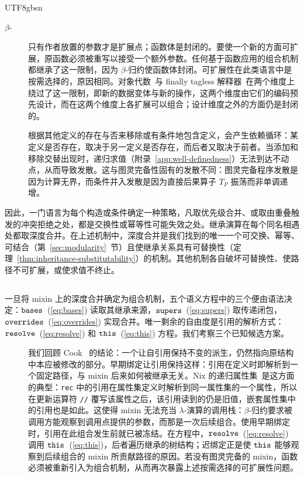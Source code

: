 \begin{CJK*}{UTF8}{gbsn}
\begin{description}
  \item[$\beta$-]
    只有作者放置的参数才是扩展点；函数体是封闭的。要使一个新的方面可扩展，原函数必须被重写以接受一个额外参数。任何基于函数应用的组合机制都继承了这一限制，因为 $\beta$-归约使函数体封闭。可扩展性在此类语言中是按需选择的，原因相同。对象代数~\cite{oliveira2012-object-algebras}与 finally tagless 解释器~\cite{carette2009-finally-tagless}在两个维度上绕过了这一限制，即新的数据变体与新的操作，这两个维度由它们的编码预先设计，而在这两个维度上各扩展可以组合；设计维度之外的方面仍是封闭的。

  \item[]
    根据其他定义的存在与否来移除或有条件地包含定义，会产生依赖循环：某定义是否存在，取决于另一定义是否存在，而后者又取决于前者。当添加和移除交替出现时，递归求值（附录~\ref{app:well-definedness}）无法到达不动点，从而导致发散。这与图灵完备性固有的发散不同：图灵完备程序发散是因为计算无界，而条件并入发散是因为直接后果算子 $T_P$ 振荡而非单调递增。
\end{description}

\noindent
因此，一门语言为每个构造或条件确定一种策略，凡取优先级合并、或取由重叠触发的冲突拒绝之处，都是交换性或幂等性可能失效之处。继承演算在每个同名相遇处都取深度合并。在上述机制中，深度合并是我们找到的唯一一个可交换、幂等、可结合（第~\ref{sec:modularity}~节）且使继承关系具有可替换性（定理~\ref{thm:inheritance-substitutability}）的机制。其他机制各自破坏可替换性、使路径不可扩展，或使求值不终止。

\subsection*{}

一旦将 mixin 上的深度合并确定为组合机制，五个语义方程中的三个便由语法决定：$\mathtt{bases}$~(\ref{eq:bases}) 读取其继承来源，$\mathtt{supers}$~(\ref{eq:supers}) 取传递闭包，$\mathtt{overrides}$~(\ref{eq:overrides}) 实现合并。唯一剩余的自由度是引用的解析方式：$\mathtt{resolve}$~(\ref{eq:resolve}) 和 $\mathtt{this}$~(\ref{eq:this}) 方程。我们考察三个已知候选方案。

\begin{description}
  \item[]
    我们回顾 Cook~\cite{cook1989-denotational-inheritance} 的结论：一个让自引用保持不变的派生，仍然指向原结构中本应被修改的部分。早期绑定让引用保持这样：引用在定义时即解析到一个固定路径，与 mixin 后来如何被继承无关。Nix 的递归属性集~\cite{dolstra2010-nixos}是这方面的典型：\texttt{rec} 中的引用在属性集定义时解析到同一属性集的一个属性，所以在更新运算符 \texttt{//} 覆写该属性之后，该引用读到的仍是旧值，嵌套属性集中的引用也是如此。这使得 mixin 无法充当 $\lambda$-演算的调用栈：$\beta$-归约要求被调用方能观察到调用点提供的参数，而那是一次后续组合。使用早期绑定时，引用在此组合发生前就已被冻结。在方程中，$\mathtt{resolve}$~(\ref{eq:resolve}) 调用 $\mathtt{this}$~(\ref{eq:this})，后者遍历继承的树结构；迟绑定正是使 $\mathtt{this}$ 能够观察到后续组合的 mixin 所贡献路径的原因。若没有图灵完备的 mixin，函数必须被重新引入为组合机制，从而再次暴露上述按需选择的可扩展性问题。


\end{description}
\end{CJK*}

